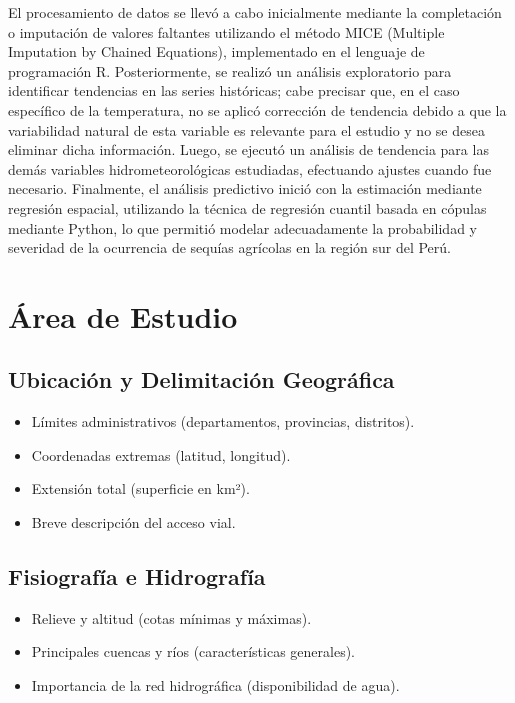El procesamiento de datos se llevó a cabo inicialmente mediante la completación o imputación de valores faltantes utilizando el método MICE (Multiple Imputation by Chained Equations), implementado en el lenguaje de programación R. Posteriormente, se realizó un análisis exploratorio para identificar tendencias en las series históricas; cabe precisar que, en el caso específico de la temperatura, no se aplicó corrección de tendencia debido a que la variabilidad natural de esta variable es relevante para el estudio y no se desea eliminar dicha información. Luego, se ejecutó un análisis de tendencia para las demás variables hidrometeorológicas estudiadas, efectuando ajustes cuando fue necesario. Finalmente, el análisis predictivo inició con la estimación mediante regresión espacial, utilizando la técnica de regresión cuantil basada en cópulas mediante Python, lo que permitió modelar adecuadamente la probabilidad y severidad de la ocurrencia de sequías agrícolas en la región sur del Perú.

\section{Área de Estudio}

\subsection{Ubicación y Delimitación Geográfica}
  \begin{itemize}
    \item Límites administrativos (departamentos, provincias, distritos).
    \item Coordenadas extremas (latitud, longitud).
    \item Extensión total (superficie en km²).
    \item Breve descripción del acceso vial.
  \end{itemize}

\subsection{Fisiografía e Hidrografía}
  \begin{itemize}
    \item Relieve y altitud (cotas mínimas y máximas).
    \item Principales cuencas y ríos (características generales).
    \item Importancia de la red hidrográfica (disponibilidad de agua).
  \end{itemize}

